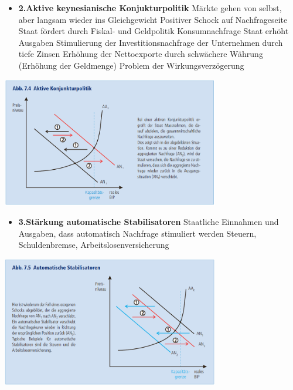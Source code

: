 	\begin{itemize}
		\item \textbf{2.Aktive keynesianische Konjukturpolitik}
		\subitem Märkte gehen von selbst, aber langsam wieder ins Gleichgewicht
		\subitem Positiver Schock auf Nachfrageseite
		\subitem Staat fördert durch Fiskal- und Geldpolitik Konsumnachfrage
		\subitem Staat erhöht Ausgaben
		\subitem Stimulierung der Investitionsnachfrage der Unternehmen durch tiefe Zinsen
		\subitem Erhöhung der Nettoexporte durch schwächere Währung (Erhöhung der Geldmenge)
		\subitem Problem der Wirkungsverzögerung
	\end{itemize}
	\includegraphics[width=9.5cm]{images/keyne.png}
	\begin{itemize}
		\item \textbf{3.Stärkung automatische Stabilisatoren}
		\subitem Staatliche Einnahmen und Ausgaben, dass automatisch Nachfrage stimuliert werden
		\subitem Steuern, Schuldenbremse, Arbeitslosenversicherung
	\end{itemize}
	\includegraphics[width=9.5cm]{images/autostab.png}


